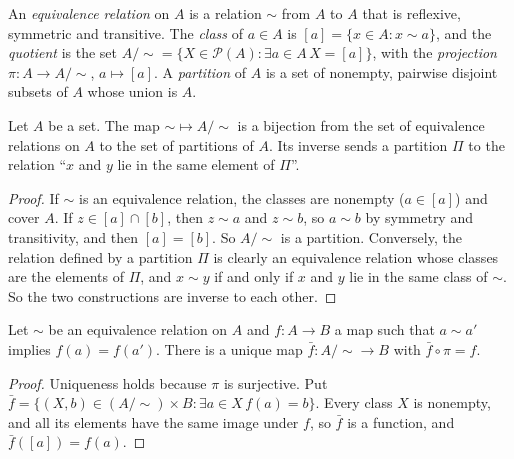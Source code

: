 \begin{definition}\label{sets:definition-equivalence-relation}
An \emph{equivalence relation} on $A$ is a relation $\sim$ from $A$ to $A$
that is reflexive, symmetric and transitive. The \emph{class} of $a \in A$ is
$[a] = \{x \in A : x \sim a\}$, and the \emph{quotient} is the set
$A/{\sim} = \{X \in \mathcal{P}(A) : \exists a \in A\, X = [a]\}$, with the
\emph{projection} $\pi \colon A \to A/{\sim}$, $a \mapsto [a]$. A
\emph{partition} of $A$ is a set of nonempty, pairwise disjoint subsets of
$A$ whose union is $A$.
\end{definition}

\begin{proposition}\label{sets:proposition-partitions}
Let $A$ be a set. The map ${\sim} \mapsto A/{\sim}$ is a bijection from the set
of equivalence relations on $A$ to the set of partitions of $A$. Its inverse
sends a partition $\Pi$ to the relation ``$x$ and $y$ lie in the same element
of $\Pi$''.
\end{proposition}

\begin{proof}
If $\sim$ is an equivalence relation, the classes are nonempty ($a \in [a]$)
and cover $A$. If $z \in [a] \cap [b]$, then $z \sim a$ and $z \sim b$, so
$a \sim b$ by symmetry and transitivity, and then $[a] = [b]$. So $A/{\sim}$
is a partition. Conversely, the relation defined by a partition $\Pi$ is
clearly an equivalence relation whose classes are the elements of $\Pi$, and
$x \sim y$ if and only if $x$ and $y$ lie in the same class of $\sim$. So the
two constructions are inverse to each other.
\end{proof}

\begin{proposition}\label{sets:proposition-quotient-property}
Let $\sim$ be an equivalence relation on $A$ and $f \colon A \to B$ a map such
that $a \sim a'$ implies $f(a) = f(a')$. There is a unique map
$\bar f \colon A/{\sim} \to B$ with $\bar f \circ \pi = f$.
\end{proposition}

\begin{proof}
Uniqueness holds because $\pi$ is surjective. Put
$\bar f = \{(X, b) \in (A/{\sim}) \times B : \exists a \in X\, f(a) = b\}$. Every
class $X$ is nonempty, and all its elements have the same image under $f$, so
$\bar f$ is a function, and $\bar f([a]) = f(a)$.
\end{proof}

